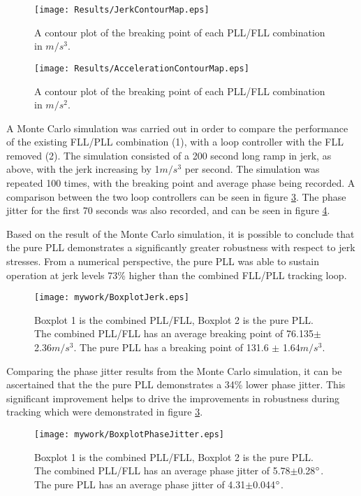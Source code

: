 \begin{figure}[!htb] 
    \centering
    \texttt{[image: Results/JerkContourMap.eps]} 
    \caption{A contour plot of the breaking point of each PLL/FLL combination in $m/s^3$.}
    \label{fig:JerkContourMap}
\end{figure}


\begin{figure}[!htb] 
    \centering
    \texttt{[image: Results/AccelerationContourMap.eps]} 
    \caption{A contour plot of the breaking point of each PLL/FLL combination in $m/s^2$.}
    \label{fig:AccelerationContourMap}
\end{figure}


A Monte Carlo simulation was carried out in order to compare the performance of the existing FLL/PLL combination (1), with a loop controller with the FLL removed (2). The simulation consisted of a 200 second long ramp in jerk, as above, with the jerk increasing by 1$m/s^3$ per second. The simulation was repeated 100 times, with the breaking point and average phase being recorded. A comparison between the two loop controllers can be seen in figure \ref{fig:BoxplotJerk}. The phase jitter for the first 70 seconds was also recorded, and can be seen in figure \ref{fig:BoxplotPhaseJitter}. 

Based on the result of the Monte Carlo simulation, it is possible to conclude that the pure PLL demonstrates a significantly greater robustness with respect to jerk stresses. From a numerical perspective, the pure PLL was able to sustain operation at jerk levels  73\% higher than the combined FLL/PLL tracking loop. 

\begin{figure}[!htb] 
    \centering
    \texttt{[image: mywork/BoxplotJerk.eps]} 
    \caption{Boxplot 1 is the combined PLL/FLL, Boxplot 2 is the pure PLL. The combined PLL/FLL has an average breaking point of 76.135$\pm$2.36$m/s^3$. The pure PLL has a breaking point of 131.6 $\pm$ 1.64$m/s^3$.}
    \label{fig:BoxplotJerk}
\end{figure}

Comparing the phase jitter results from the Monte Carlo simulation, it can be ascertained that the the pure PLL demonstrates a 34\% lower phase jitter. This significant improvement helps to drive the improvements in robustness during tracking which were demonstrated in figure \ref{fig:BoxplotJerk}. 

\begin{figure}[!htb] 
    \centering
    \texttt{[image: mywork/BoxplotPhaseJitter.eps]} 
    \caption{Boxplot 1 is the combined PLL/FLL, Boxplot 2 is the pure PLL. The combined PLL/FLL has an average phase jitter of 5.78$\pm$0.28$\degree$. The pure PLL has an average phase jitter of 4.31$\pm$0.044$\degree$.}
    \label{fig:BoxplotPhaseJitter}
\end{figure}

